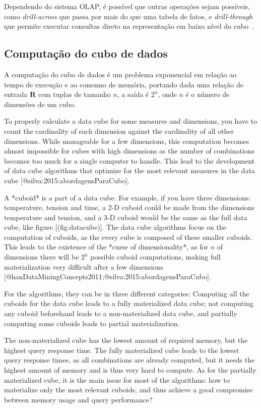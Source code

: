 Dependendo do sistema OLAP, é possível que outras operações sejam possíveis, como \textit{drill-across} que passa por mais do que uma tabela de fatos, e \textit{drill-through} que permite executar consultas direto na representação em baixo nível do cubo~\cite{hanDataMiningConcepts2011}.

\subsection{Computação do cubo de dados}
\label{ch:fun:cube:comp}

A computação do cubo de dados é um problema exponencial em relação ao tempo de execução e ao consumo de memória, portando dada uma relação de entrada \textbf{R} com tuplas de tamanho $n$, a saída é $2^n$, onde $n$ é o número de dimensões de um cubo.

To properly calculate a data cube for some measures and dimensions, you have to count the cardinality of each dimension against the cardinality of all other dimensions.
While manageable for a few dimensions, this computation becomes almost impossible for cubes with high dimensions as the number of combinations becomes too much for a single computer to handle.
This lead to the development of data cube algorithms that optimize for the most relevant measures in the data cube [@silva:2015:abordagensParaCubo].

A *cuboid* is a part of a data cube. For example, if you have three dimensions: temperature, tension and time, a 2-D cuboid could be made from the dimensions temperature and tension, and a 3-D cuboid would be the same as the full data cube, like figure [\@ref(fig:datacube)].
The data cube algorithms focus on the computation of cuboids, as the every cube is composed of these smaller cuboids.
This leads to the existence of the *curse of dimensionality*, as for $n$ of dimensions there will be $2^n$ possible cuboid computations, making full materialization very difficult after a few dimensions [@hanDataMiningConcepts2011;@silva:2015:abordagensParaCubo].

For the algorithms, they can be in three different categories: Computing all the cuboids for the data cube leads to a fully materialized data cube; not computing any cuboid beforehand leads to a non-materialized data cube, and partially computing some cuboids leads to partial materialization.

The non-materialized cube has the lowest amount of required memory, but the highest query response time.
The fully materialized cube leads to the lowest query response times, as all combinations are already computed, but it needs the highest amount of memory and is thus very hard to compute.
As for the partially materialized cube, it is the main issue for most of the algorithms: how to materialize only the most relevant cuboids, and thus achieve a good compromise between memory usage and query performance?

